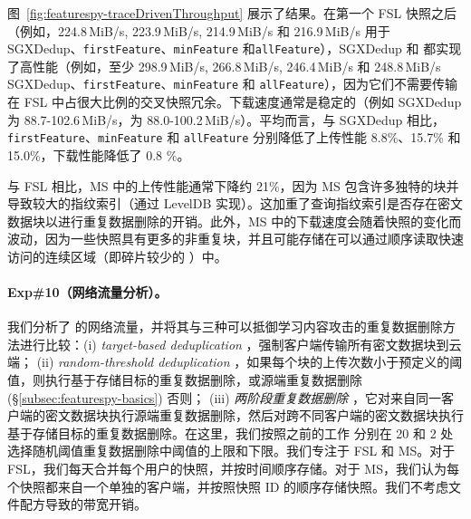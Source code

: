 图~\ref{fig:featurespy-traceDrivenThroughput} 展示了结果。在第一个 FSL 快照之后（例如，224.8\,MiB/s, 223.9\,MiB/s, 214.9\,MiB/s 和 216.9\,MiB/s 用于 SGXDedup、{\tt firstFeature}、{\tt minFeature} 和{\tt allFeature}），SGXDedup 和 \prototype 都实现了高性能（例如，至少 298.9\,MiB/s, 266.8\,MiB/s, 246.4\,MiB/s 和 248.8\,MiB/s SGXDedup、{\tt firstFeature}、{\tt minFeature} 和 {\tt allFeature}），因为它们不需要传输在 FSL 中占很大比例的交叉快照冗余。下载速度通常是稳定的（例如 SGXDedup 为 88.7-102.6\,MiB/s，\prototype 为 88.0-100.2\,MiB/s）。平均而言，与 SGXDedup 相比，{\tt firstFeature}、{\tt minFeature} 和 {\tt allFeature} 分别降低了上传性能 8.8\%、15.7\% 和 15.0\%，下载性能降低了 0.8 \%。

与 FSL 相比，MS 中的上传性能通常下降约 21\%，因为 MS 包含许多独特的块并导致较大的指纹索引（通过 LevelDB \cite{leveldb} 实现）。这加重了查询指纹索引是否存在密文数据块以进行重复数据删除的开销。此外，MS 中的下载速度会随着快照的变化而波动，因为一些快照具有更多的非重复块，并且可能存储在可以通过顺序读取快速访问的连续区域（即碎片较少的 \cite{lillibridge13}）中。


\paragraph*{Exp\#10（网络流量分析）。}
我们分析了 \prototype 的网络流量，并将其与三种可以抵御学习内容攻击的重复数据删除方法进行比较：(i) {\em target-based deduplication} \cite{harnik10}，强制客户端传输所有密文数据块到云端； (ii) {\em random-threshold deduplication} \cite{harnik10}，如果每个块的上传次数小于预定义的阈值，则执行基于存储目标的重复数据删除，或源端重复数据删除 (\S\ref{subsec:featurespy-basics}) 否则； (iii) {\em 两阶段重复数据删除} \cite{li15}，它对来自同一客户端的密文数据块执行源端重复数据删除，然后对跨不同客户端的密文数据块执行基于存储目标的重复数据删除。在这里，我们按照之前的工作 \cite{harnik10} 分别在 20 和 2 处选择随机阈值重复数据删除中阈值的上限和下限。我们专注于 FSL 和 MS。对于 FSL，我们每天合并每个用户的快照，并按时间顺序存储。对于 MS，我们认为每个快照都来自一个单独的客户端，并按照快照 ID 的顺序存储快照。我们不考虑文件配方导致的带宽开销。

